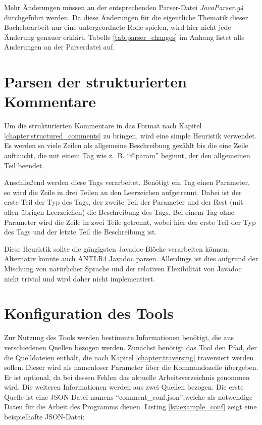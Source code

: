 Mehr Änderungen müssen an der entsprechenden Parser-Datei \textit{JavaParser.g4} durchgeführt werden.  Da diese Änderungen für die eigentliche Thematik dieser Bachelorarbeit nur eine untergeordnete Rolle spielen, wird hier nicht jede Änderung genauer erklärt. Tabelle \ref{tab:parser_changes} im Anhang listet alle Änderungen an der Parserdatei auf. 
\section{Parsen der strukturierten Kommentare}
Um die strukturierten Kommentare in das Format nach Kapitel \ref{chapter:structured_comments} zu bringen, wird eine simple Heuristik verwendet. Es werden so viele Zeilen als allgemeine Beschreibung gezählt bis die eine Zeile auftaucht, die mit einem Tag wie z.~B. \enquote{@param} beginnt, der den allgemeinen Teil beendet.

Anschließend werden diese Tags verarbeitet. Benötigt ein Tag einen Parameter, so wird die Zeile in drei Teilen an den Leerzeichen aufgetrennt. Dabei ist der erste Teil der Typ des Tags, der zweite Teil der Parameter und der Rest (mit allen übrigen Leerzeichen) die Beschreibung des Tags.
Bei einem Tag ohne Parameter wird die Zeile in zwei Teile getrennt, wobei hier der erste Teil der Typ des Tags und der letzte Teil die Beschreibung ist.

Diese Heuristik sollte die gängigsten Javadoc-Blöcke verarbeiten können. Alternativ könnte auch ANTLR4 Javadoc parsen. Allerdings ist dies aufgrund der Mischung von natürlicher Sprache und der relativen Flexibilität von Javadoc nicht trivial und wird daher nicht implementiert. 



\section{Konfiguration des Tools}\label{chapter:conf}
Zur Nutzung des Tools werden bestimmte Informationen benötigt, die aus verschiedenen Quellen bezogen werden. Zunächst benötigt das Tool den Pfad, der die Quelldateien enthält, die nach Kapitel \ref{chapter:traversing} traversiert werden sollen. Dieser wird als namenloser Parameter über die Kommandozeile übergeben. Er ist optional, da bei dessen Fehlen das aktuelle Arbeitsverzeichnis genommen wird. Die weiteren Informationen werden aus zwei Quellen bezogen. Die erste Quelle ist eine \ac{JSON}-Datei namens \enquote{comment\_conf.json},welche als notwendige Daten für die Arbeit des Programms dienen. Listing \ref{lst:example_conf} zeigt eine beispielhafte \ac{JSON}-Datei:

